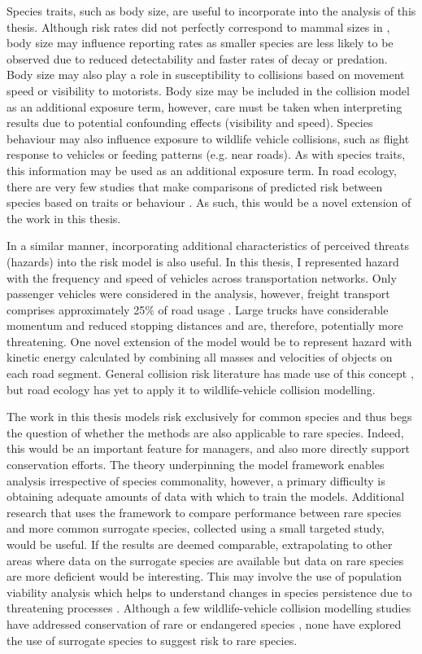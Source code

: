 Species traits, such as body size, are useful to incorporate into the analysis of this thesis. Although risk rates did not perfectly correspond to mammal sizes in , body size may influence reporting rates as smaller species are less likely to be observed due to reduced detectability and faster rates of decay or predation. Body size may also play a role in susceptibility to collisions based on movement speed \citep{jaar06} or visibility to motorists. Body size may be included in the collision model as an additional exposure term, however, care must be taken when interpreting results due to potential confounding effects (visibility and speed). Species behaviour may also influence exposure to wildlife vehicle collisions, such as flight response to vehicles \citep{deva14,lee10} or feeding patterns (e.g. near roads). As with species traits, this information may be used as an additional exposure term. In road ecology, there are very few studies that make comparisons of predicted risk between species based on traits or behaviour \citep[but see][]{litv08}. As such, this would be a novel extension of the work in this thesis. 

In a similar manner, incorporating additional characteristics of perceived threats (hazards) into the risk model is also useful. In this thesis, I represented hazard with the frequency and speed of vehicles across transportation networks. Only passenger vehicles were considered in the analysis, however, freight transport comprises approximately 25\% of road usage \citep{abs11}. Large trucks have considerable momentum and reduced stopping distances and are, therefore, potentially more threatening. One novel extension of the model would be to represent hazard with kinetic energy calculated by combining all masses and velocities of objects on each road segment. General collision risk literature has made use of this concept \citep{aart06}, but road ecology has yet to apply it to wildlife-vehicle collision modelling.

The work in this thesis models risk exclusively for common species and thus begs the question of whether the methods are also applicable to rare species. Indeed, this would be an important feature for managers, and also more directly support conservation efforts. The theory underpinning the model framework enables analysis irrespective of species commonality, however, a primary difficulty is obtaining adequate amounts of data with which to train the models. Additional research that uses the framework to compare performance between rare species and more common surrogate species, collected using a small targeted study, would be useful. If the results are deemed comparable, extrapolating to other areas where data on the surrogate species are available but data on rare species are more deficient would be interesting. This may involve the use of population viability analysis which helps to understand changes in species persistence due to threatening processes \citep{rhod14}. Although a few wildlife-vehicle collision modelling studies have addressed conservation of rare or endangered species \citep{dwye16}, none have explored the use of surrogate species to suggest risk to rare species.

